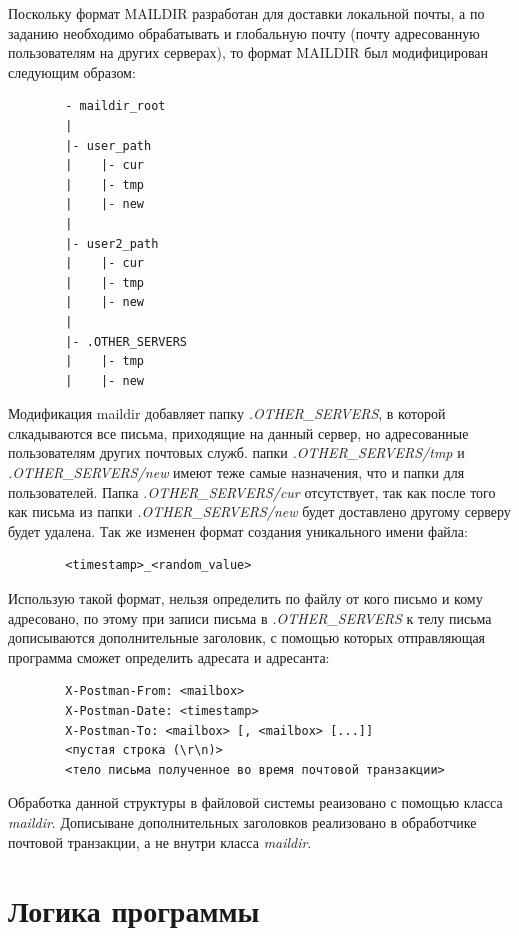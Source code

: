 \documentclass[a4paper,12pt]{report}
\begin{document}
    Поскольку формат MAILDIR разработан для доставки локальной почты, а по заданию необходимо обрабатывать и глобальную почту (почту адресованную пользователям на других серверах), то формат MAILDIR был модифицирован следующим образом: 
        
        \begin{verbatim}
        - maildir_root
        |
        |- user_path
        |    |- cur
        |    |- tmp
        |    |- new
        |
        |- user2_path
        |    |- cur
        |    |- tmp
        |    |- new
        |
        |- .OTHER_SERVERS
        |    |- tmp
        |    |- new
    \end{verbatim}
    Модификация maildir добавляет папку \textit{.OTHER\_SERVERS}, в которой слкадываются все письма, приходящие на данный сервер, но адресованные пользователям других почтовых служб. папки \textit{.OTHER\_SERVERS/tmp} и  \textit{.OTHER\_SERVERS/new} имеют теже самые назначения, что и папки для пользователей. Папка \textit{.OTHER\_SERVERS/cur} отсутствует, так как после того как письма из папки \textit{.OTHER\_SERVERS/new} будет доставлено другому серверу будет удалена. Так же изменен формат создания уникального имени файла:
    \begin{verbatim}
        <timestamp>_<random_value>
    \end{verbatim}
    Использую такой формат, нельзя определить по файлу от кого письмо и кому адресовано, по этому при записи письма в \textit{.OTHER\_SERVERS} к телу письма дописываются дополнительные заголовик, с помощью которых отправляющая программа сможет определить адресата и адресанта:
    \begin{verbatim}
        X-Postman-From: <mailbox>
        X-Postman-Date: <timestamp>
        X-Postman-To: <mailbox> [, <mailbox> [...]]
        <пустая строка (\r\n)>
        <тело письма полученное во время почтовой транзакции>
    \end{verbatim}
    
    Обработка данной структуры в файловой системы реаизовано с помощью класса \textit{maildir}. Дописыване дополнительных заголовков реализовано в обработчике почтовой транзакции, а не внутри класса \textit{maildir}.

\section{Логика программы}
\end{document}
